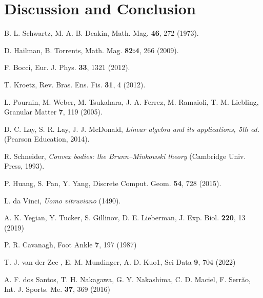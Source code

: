 \documentclass[a4paper,12pt]{article}
\begin{document}
\newpage
\section{Discussion and Conclusion}



\clearpage  %

\begin{thebibliography}{9}

B. L. Schwartz, M. A. B. Deakin, Math. Mag. {\bf 46}, 272 (1973).

D. Hailman, B. Torrents,  Math. Mag. {\bf 82:4}, 266 (2009).

F. Bocci,  Eur. J. Phys. {\bf 33}, 1321 (2012).

T. Kroetz, Rev. Bras. Ens. Fis. {\bf 31}, 4 (2012).

L. Pournin, M. Weber, M. Tsukahara, J. A. Ferrez, M. Ramaioli, T. M. Liebling, Granular Matter {\bf 7}, 119 (2005).

D. C. Lay, S. R. Lay, J. J. McDonald,
{\it Linear algebra and its applications, 5th ed.} (Pearson Education, 2014).

R. Schneider,
{\it Convex bodies: the Brunn–Minkowski theory} (Cambridge Univ. Press, 1993).

P. Huang, S. Pan, Y. Yang, Discrete Comput. Geom. {\bf 54}, 728 (2015).

L. da Vinci, {\it Uomo vitruviano} (1490).

A. K. Yegian, Y. Tucker, S. Gillinov, D. E. Lieberman, J. Exp. Biol. {\bf 220}, 13 (2019) 

P. R. Cavanagh, Foot Ankle {\bf 7}, 197 (1987)

T. J. van der Zee , E. M. Mundinger, A. D. Kuo1,  Sci Data {\bf 9}, 704 (2022)

 A. F. dos Santos, T. H. Nakagawa, G. Y. Nakashima, C. D. Maciel, F. Serrão, Int. J. Sports. Me. {\bf 37}, 369 (2016)


\end{thebibliography}
\end{document}
